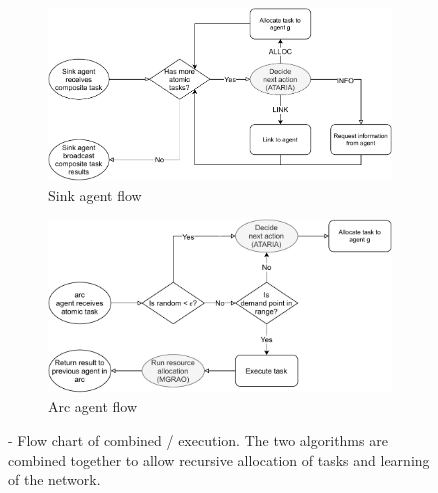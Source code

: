 \begin{figure}[ht]
	\centering
\begin{subfigure}{.49\textwidth}
	\centering
	\includegraphics[width=0.9\linewidth]{algorithm-flow-sink}
	\caption{Sink agent flow}
	\label{fig:algorithm-flow-sink}
\end{subfigure}
\begin{subfigure}{.49\textwidth}
	\centering	\includegraphics[width=0.9\linewidth]{algorithm-flow-arc}
	\caption{Arc agent flow}
	\label{fig:algorithm-flow-arc}
\end{subfigure}
	\caption{\textbf{\acronymWSNOptimisation{}{}} - Flow chart of combined \acronymATARIA{}{}/\acronymMGRAO{}{} execution. The two algorithms are combined together to allow recursive allocation of tasks and learning of the network.}
\label{fig:algorithm-flow}
\end{figure}